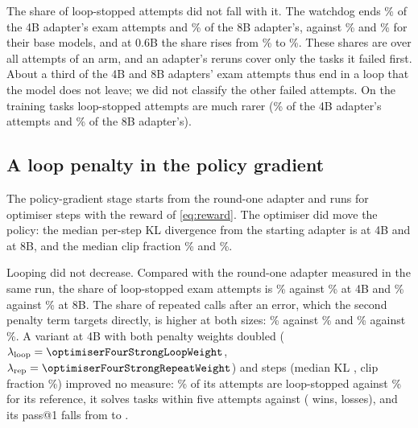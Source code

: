 The share of loop-stopped attempts did not fall with it. The watchdog ends \behaviourFourFullExamLoopPct{}\% of the 4B
adapter's exam attempts and \behaviourEightFullExamLoopPct{}\% of the 8B adapter's, against
\behaviourFourBaseExamLoopPct{}\% and \behaviourEightBaseExamLoopPct{}\% for their base models, and at 0.6B the share
rises from \behaviourZeroBaseExamLoopPct{}\% to \behaviourZeroFullExamLoopPct{}\%. These shares are over all attempts
of an arm, and an adapter's reruns cover only the tasks it failed first. About a third of the 4B and 8B
adapters' exam attempts thus end in a loop that the model does not leave; we did not classify the other failed
attempts. On the training tasks loop-stopped attempts are much rarer (\behaviourFourFullTrainLoopPct{}\% of the 4B
adapter's attempts and \behaviourEightFullTrainLoopPct{}\% of the 8B adapter's).

\subsection{A loop penalty in the policy gradient}
The policy-gradient stage starts from the round-one adapter and runs for \optimiserFourSteps{} optimiser steps with the
reward of \cref{eq:reward}. The optimiser did move the policy: the median per-step KL divergence from the starting
adapter is \optimiserFourKl{} at 4B and \optimiserEightKl{} at 8B, and the median clip fraction
\optimiserFourClip{}\% and \optimiserEightClip{}\%.

Looping did not decrease. Compared with the round-one adapter measured in the same run, the share of loop-stopped exam
attempts is \behaviourFourPgExamLoopPct{}\% against \behaviourFourPgrefExamLoopPct{}\% at 4B and
\behaviourEightPgExamLoopPct{}\% against \behaviourEightPgrefExamLoopPct{}\% at 8B. The share of repeated calls after
an error, which the second penalty term targets directly, is higher at both sizes: \behaviourFourPgExamRepeatPct{}\%
against \behaviourFourPgrefExamRepeatPct{}\% and \behaviourEightPgExamRepeatPct{}\% against
\behaviourEightPgrefExamRepeatPct{}\%. A variant at 4B with both penalty weights doubled
($\lambda_{\text{loop}}=\optimiserFourStrongLoopWeight$, $\lambda_{\text{rep}}=\optimiserFourStrongRepeatWeight$) and
\optimiserFourStrongSteps{} steps (median KL \optimiserFourStrongKl{}, clip fraction \optimiserFourStrongClip{}\%)
improved no measure: \behaviourFourPgdExamLoopPct{}\% of its attempts are loop-stopped against
\behaviourFourPgdrefExamLoopPct{}\% for its reference, it solves \examFourPgdFive{} tasks within five attempts against
\examFourPgdrefFive{} (\winsFourPgd{} wins, \lossesFourPgd{} losses), and its pass@1 falls from \examFourPgdrefOne{} to
\examFourPgdOne{}.

